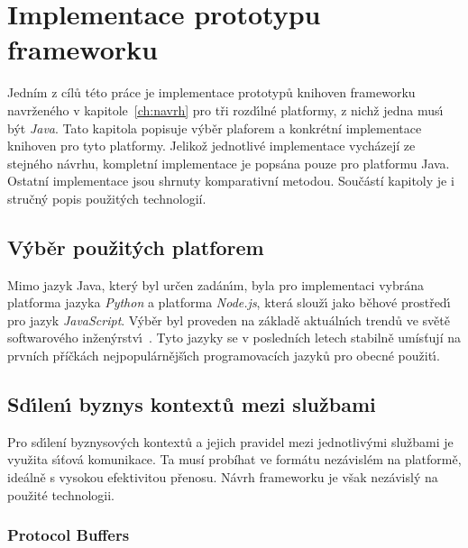

\chapter{Implementace prototypu frameworku}\label{ch:implementace}

Jedním z cílů této práce je implementace prototypů
knihoven frameworku navrženého v kapitole~\ref{ch:navrh}
pro tři rozd\'{\i}lné platformy, z nichž jedna mus\'{\i} b\'yt \textit{Java}.
Tato kapitola popisuje výběr plaforem a konkrétní implementace
knihoven pro tyto platformy. Jelikož jednotlivé implementace
vycházejí ze stejného návrhu, kompletní implementace
je popsána pouze pro platformu Java. Ostatní implementace jsou
shrnuty komparativní metodou. Součástí kapitoly je i stručný popis
použitých technologií.

\section{V\'yběr použit\'ych platforem}

Mimo jazyk Java, kter\'y byl určen zadán\'{\i}m, byla pro
implementaci vybrána platforma jazyka \textit{Python} a platforma \textit{Node.js},
která slouž\'{\i} jako běhové prostřed\'{\i} pro jazyk \textit{JavaScript}.
V\'yběr byl proveden na základě aktuáln\'{\i}ch trendů ve světě softwarového
inžen\'yrstv\'{\i}~\cite{octoverse, githut, stackoverflowsurvey}.
Tyto jazyky se v posledních letech stabilně umísťují na prvních příčkách
nejpopulárnějš\'{\i}ch programovacích jazyků pro obecné použit\'{\i}.

\section{Sd\'{\i}len\'{\i} byznys kontextů mezi službami}

Pro sd\'{\i}lení byznysových kontextů a jejich pravidel
mezi jednotliv\'ymi službami je využita s\'{\i}ťová komunikace.
Ta musí probíhat ve formátu nezávislém na platformě, ideálně s vysokou
efektivitou přenosu. Návrh frameworku je však nezávislý na použité technologii.

\subsection{Protocol Buffers}

